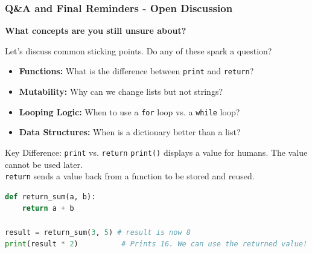 \documentclass{beamer}
\begin{document}
\begin{frame}[fragile]
    \frametitle{Q\&A and Final Reminders - Open Discussion}
    \begin{center}
        \Large \textbf{What concepts are you still unsure about?}
    \end{center}
    \vspace{1em}
    Let's discuss common sticking points. Do any of these spark a question?
    \begin{itemize}
        \item \textbf{Functions:} What is the difference between \texttt{print} and \texttt{return}?
        \item \textbf{Mutability:} Why can we change lists but not strings?
        \item \textbf{Looping Logic:} When to use a \texttt{for} loop vs. a \texttt{while} loop?
        \item \textbf{Data Structures:} When is a dictionary better than a list?
    \end{itemize}

    \begin{block}{Key Difference: \texttt{print} vs. \texttt{return}}
        \texttt{print()} displays a value for humans. The value cannot be used later. \\
        \texttt{return} sends a value back from a function to be stored and reused.
        \begin{lstlisting}[language=Python]
% This function's result CAN be stored
def return_sum(a, b):
    return a + b

result = return_sum(3, 5) # result is now 8
print(result * 2)          # Prints 16. We can use the returned value!
        \end{lstlisting}
    \end{block}
\end{frame}
\end{document}
